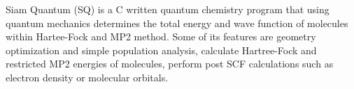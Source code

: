 Siam Quantum (SQ) is a C written quantum chemistry program that using quantum mechanics determines the total energy and wave function of molecules within Hartee-Fock and MP2 method. Some of its features are geometry optimization and simple population analysis, calculate Hartree-Fock and restricted MP2 energies of molecules, perform post SCF calculations such as electron density or molecular orbitals.